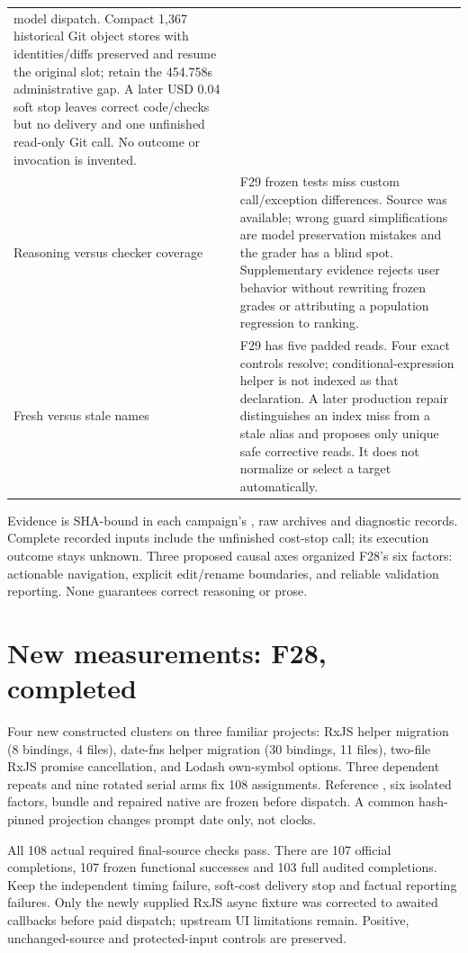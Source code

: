 \documentclass[11pt,a4paper]{article}
\newcommand{\code}[1]{\texttt{\detokenize{#1}}}
\begin{document}
\begin{longtable}{@{}p{.22\linewidth}p{.71\linewidth}@{}}
model dispatch. Compact 1,367 historical Git object stores with identities/diffs
preserved and resume the original slot; retain the 454.758s administrative gap.
A later USD 0.04 soft stop leaves correct code/checks but no delivery and one
unfinished read-only Git call. No outcome or invocation is invented. \\
Reasoning versus checker coverage & F29 frozen tests miss custom
\code{lodash.iteratee} call/exception differences. Source was available;
wrong guard simplifications are model preservation mistakes and the grader has
a blind spot. Supplementary evidence rejects user behavior without rewriting
frozen grades or attributing a population regression to ranking. \\
Fresh versus stale names & F29 has five padded \code{path# name} reads.
Four exact controls resolve; conditional-expression helper \code{getSymbols}
is not indexed as that declaration. A later production repair distinguishes
an index miss from a stale alias and proposes only unique safe corrective
reads. It does not normalize or select a target automatically. \\
\bottomrule
\end{longtable}
Evidence is SHA-bound in each campaign's \code{source-review.json}, raw
archives and diagnostic records. Complete recorded inputs include the unfinished
cost-stop call; its execution outcome stays unknown. Three proposed causal axes
organized F28's six factors: actionable navigation, explicit edit/rename boundaries,
and reliable validation reporting. None guarantees correct reasoning or prose.

\section{New measurements: F28, completed}
Four new constructed clusters on three familiar projects: RxJS helper migration
(8 bindings, 4 files), date-fns helper migration (30 bindings, 11 files), two-file
RxJS promise cancellation, and Lodash own-symbol options. Three dependent repeats
and nine rotated serial arms fix 108 assignments. Reference \code{50680158},
six isolated factors, bundle \code{5f310425} and repaired native are frozen before
dispatch. A common hash-pinned projection changes prompt date only, not clocks.

All 108 actual required final-source checks pass. There are 107 official
completions, 107 frozen functional successes and 103 full audited completions.
Keep the independent timing failure, soft-cost delivery stop and factual reporting
failures. Only the newly supplied RxJS async fixture was corrected to awaited
callbacks before paid dispatch; upstream UI limitations remain. Positive,
unchanged-source and protected-input controls are preserved.
\end{document}
